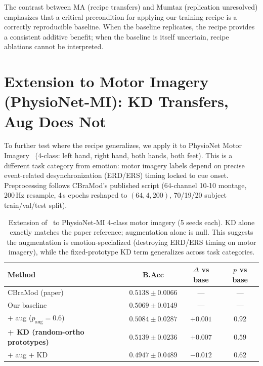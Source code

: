 The contrast between MA (recipe transfers) and Mumtaz (replication unresolved) emphasizes that a critical precondition for applying our training recipe is a correctly reproducible baseline. When the baseline replicates, the recipe provides a consistent additive benefit; when the baseline is itself uncertain, recipe ablations cannot be interpreted.

\section{Extension to Motor Imagery (PhysioNet-MI): KD Transfers, Aug Does Not}
\label{sec:supp_physio}

To further test where the \ours recipe generalizes, we apply it to PhysioNet Motor Imagery~\cite{goldberger2000physionet} (4-class: left hand, right hand, both hands, both feet). This is a different task category from emotion: motor imagery labels depend on precise event-related desynchronization (ERD/ERS) timing locked to cue onset. Preprocessing follows CBraMod's published script (64-channel 10-10 montage, 200\,Hz resample, 4\,s epochs reshaped to $(64, 4, 200)$, 70/19/20 subject train/val/test split).

\begin{table}[!h]
\caption{Extension of \ours\ to PhysioNet-MI 4-class motor imagery (5 seeds each). KD alone exactly matches the paper reference; augmentation alone is null. This suggests the augmentation is emotion-specialized (destroying ERD/ERS timing on motor imagery), while the fixed-prototype KD term generalizes across task categories.}
\small
\centering
\begin{tabular}{lccc}
\toprule
Method & B.Acc & $\Delta$ vs base & $p$ vs base \\
\midrule
CBraMod (paper)~\cite{wang2025cbramod} & $0.5138 \pm 0.0066$ & --- & --- \\
\midrule
Our baseline & $0.5069 \pm 0.0149$ & --- & --- \\
\quad + aug ($p_{\text{aug}}=0.6$) & $0.5084 \pm 0.0287$ & $+0.001$ & $0.92$ \\
\rowcolor{blond}
\quad \textbf{+ KD (random-ortho prototypes)} & $\mathbf{0.5139 \pm 0.0236}$ & $\mathbf{+0.007}$ & $0.59$ \\
\quad + aug + KD & $0.4947 \pm 0.0489$ & $-0.012$ & $0.62$ \\
\bottomrule
\end{tabular}
\label{tab:supp_physio}
\end{table}

